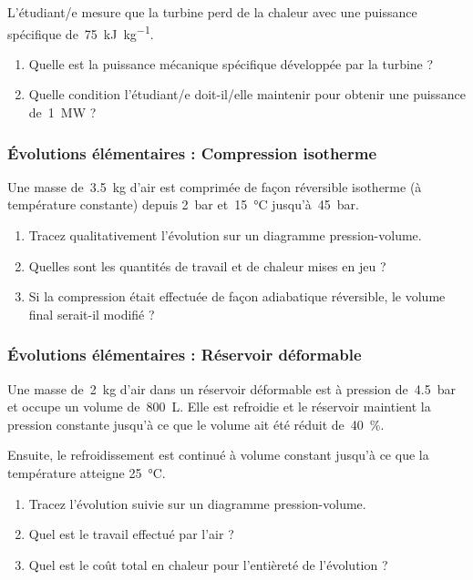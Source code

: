 	L’étudiant/e mesure que la turbine perd de la chaleur avec une puissance spécifique de~\SI{75}{\kilo\joule\per\kilogram}.
	
	\begin{enumerate}
		\item Quelle est la puissance mécanique spécifique développée par la turbine ?
		\item Quelle condition l’étudiant/e doit-il/elle maintenir pour obtenir une puissance de~\SI{1}{\mega\watt} ?
	\end{enumerate}


\subsubsection{Évolutions élémentaires : Compression isotherme}

	\wherefrom{[DS n°2 2011, 4pts]}

	Une masse de~\SI{3,5}{\kilogram} d’air est comprimée de façon réversible isotherme (à température constante) depuis \SI{2}{\bar} et~\SI{15}{\degreeCelsius} jusqu’à~\SI{45}{\bar}.
	
	\begin{enumerate}
		\item Tracez qualitativement l’évolution sur un diagramme pression-volume.
		\item Quelles sont les quantités de travail et de chaleur mises en jeu ?
		\item Si la compression était effectuée de façon adiabatique réversible, le volume final serait-il modifié ?
	\end{enumerate}
	
	
\subsubsection{Évolutions élémentaires : Réservoir déformable}

	\wherefrom{[DS n°2 2010, 5pts]}

	Une masse de~\SI{2}{\kilogram} d’air dans un réservoir déformable est à pression de~\SI{4,5}{\bar} et occupe un volume de~\SI{800}{\liter}. Elle est refroidie et le réservoir maintient la pression constante jusqu’à ce que le volume ait été réduit de~\SI{40}{\percent}.
	
	Ensuite, le refroidissement est continué à volume constant jusqu’à ce que la température atteigne \SI{25}{\degreeCelsius}.
	
	\begin{enumerate}
		\item Tracez l’évolution suivie sur un diagramme pression-volume.
		\item Quel est le travail effectué par l’air ?
		\item Quel est le coût total en chaleur pour l’entièreté de l’évolution ?
	\end{enumerate}


